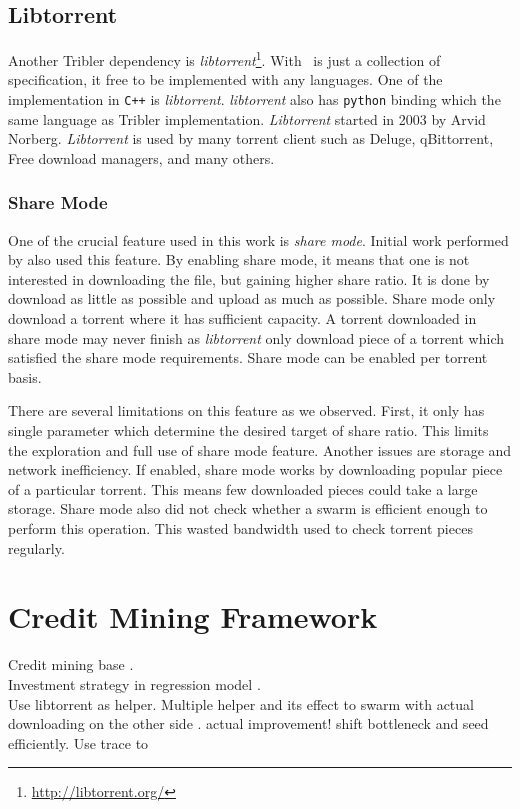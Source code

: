 \subsection{Libtorrent}
Another Tribler dependency is \textit{libtorrent}\footnote{\url{http://libtorrent.org/}}. With \bt~is just a collection of specification, it free to be implemented with any languages. One of the implementation in \texttt{C++} is \textit{libtorrent}. \textit{libtorrent} also has \texttt{python} binding which the same language as Tribler implementation. \textit{Libtorrent} started in 2003 by Arvid Norberg. \textit{Libtorrent} is used by many torrent client such as Deluge, qBittorrent, Free download managers, and many others.

\subsubsection{Share Mode}
One of the crucial feature used in this work is \textit{share mode}. Initial work performed by \citeauthor{2015:creditmining:capota} also used this feature\cite{2015:creditmining:capota}. By enabling share mode, it means that one is not interested in downloading the file, but gaining higher share ratio. It is done by download as little as possible and upload as much as possible. Share mode only download a torrent where it has sufficient capacity. A torrent downloaded in share mode may never finish as \textit{libtorrent} only download piece of a torrent which satisfied the share mode requirements. Share mode can be enabled per torrent basis.

There are several limitations on this feature as we observed. First, it only has single parameter which determine the desired target of share ratio. This limits the exploration and full use of share mode feature. Another issues are storage and network inefficiency. If enabled, share mode works by downloading popular piece of a particular torrent. This means few downloaded pieces could take a large storage. Share mode also did not check whether a swarm is efficient enough to perform this operation. This wasted bandwidth used to check torrent pieces regularly.

\section{Credit Mining Framework}
Credit mining base \cite{2015:creditmining:capota}.\\ Investment strategy in regression model \cite{2013:investmentcm:capota}. \\Use libtorrent as helper. Multiple helper and its effect to swarm with actual downloading on the other side \cite{2014:bwmarket:capota}. actual improvement! shift bottleneck and seed efficiently. Use trace to 


